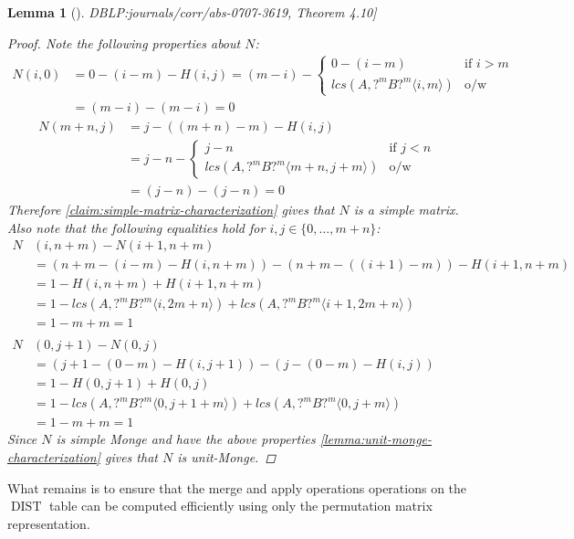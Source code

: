 \documentclass[twoside,11pt,openright]{report}
\newcommand{\DIST}{\operatorname{DIST}}
\newcommand{\substr}[3]{#1\langle #2, #3 \rangle}
\newcommand{\refbook}[2]{\cite[#1]{DBLP:journals/corr/abs-0707-3619}, #2}
\newtheorem{lemma}{Lemma}
\begin{document}
\begin{lemma}[\refbook{p.-49}{Theorem 4.10}]
\begin{proof}
    Note the following properties about $N$:
    \begin{align*}
      N(i, 0) &= 0 - (i - m) - H(i, j)
        = (m - i) - \begin{cases}
          0 - (i - m)                    & \text{if } i > m \\
          lcs(A, \substr{?^mB?^m}{i}{m}) & \text{o/w}
        \end{cases} \\
        &= (m - i) - (m - i) = 0
    \end{align*}
    \begin{align*}
      N(m + n, j) &= j - ((m + n) - m) - H(i, j) \\
        &= j - n - \begin{cases}
          j - n                                   & \text{if } j < n \\
          lcs(A, \substr{?^mB?^m}{m + n}{j + m})  & \text{o/w}
        \end{cases} \\
        &= (j - n) - (j - n) = 0
    \end{align*}
    Therefore \cref{claim:simple-matrix-characterization} gives that $N$ is a simple matrix. Also note that the following equalities hold for $i,j \in \{0, \dots, m + n\}$:
    \begin{align*}
      N&(i, n + m) - N(i + 1, n + m) \\
        &= (n + m - (i - m) - H(i, n + m)) - (n + m - ((i + 1) - m)) - H(i + 1, n + m) \\
        &= 1 - H(i, n + m) + H(i + 1, n + m) \\
        &= 1 - lcs(A, \substr{?^mB?^m}{i}{2m+n}) + lcs(A, \substr{?^mB?^m}{i + 1}{2m+n}) \\
        &= 1 - m + m = 1
    \\ \\
      N&(0, j + 1) - N(0, j) \\
        &= (j + 1 - (0 - m) - H(i, j + 1)) - (j - (0 - m) - H(i, j)) \\
        &= 1 - H(0, j + 1) + H(0, j) \\
        &= 1 - lcs(A, \substr{?^mB?^m}{0}{j + 1 + m}) + lcs(A, \substr{?^mB?^m}{0}{j + m}) \\
        &= 1 - m + m = 1
    \end{align*}
    Since $N$ is simple Monge and have the above properties \cref{lemma:unit-monge-characterization} gives that $N$ is unit-Monge.
  \end{proof}
\end{lemma}
What remains is to ensure that the merge and apply operations operations on the $\DIST$ table can be computed efficiently using only the permutation matrix representation.
\end{document}
